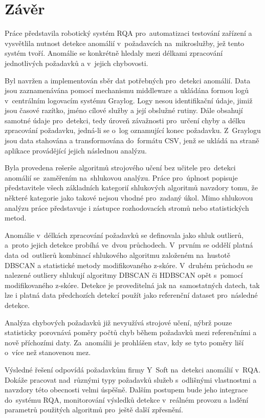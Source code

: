 \chapter*{Závěr}

Práce představila robotický systém RQA pro~automatizaci testování zařízení a vysvětlila nutnost detekce anomálií v~požadavcích na~mikroslužby, jež tento systém tvoří. Anomálie se konkrétně hledaly mezi délkami zpracování jednotlivých požadavků a v~jejich chybovosti.

Byl navržen a implementován sběr dat potřebných pro~detekci anomálií. Data jsou zaznamenávána pomocí mechanismu middleware a ukládána formou logů v~centrálním logovacím systému Graylog. Logy nesou identifikační údaje, jimiž jsou časové razítko, jméno cílové služby a její obslužné rutiny. Dále obsahují samotné údaje pro~detekci, tedy úroveň závažnosti pro~určení chyby a délku zpracování požadavku, jedná-li se o~log oznamující konec požadavku. Z~Graylogu jsou data stahována a transformována do~formátu CSV, jenž se ukládá na straně aplikace provádějící jejich následnou analýzu.

Byla provedena rešerše algoritmů strojového učení bez učitele pro~detekci anomálií se~zaměřením na~shlukovou analýzu. Práce pro~úplnost popisuje představitele všech základních kategorií shlukových algoritmů navzdory tomu, že některé kategorie jako takové nejsou vhodné pro~zadaný úkol. Mimo shlukovou analýzu práce představuje i zástupce rozhodovacích stromů nebo statistických metod.

Anomálie v~délkách zpracování požadavků se definovala jako shluk outlierů, a~proto jejich detekce probíhá ve~dvou průchodech. V~prvním se oddělí platná data od~outlierů kombinací shlukového algoritmu založeném na~hustotě DBSCAN a statistické metody modifikovaného z-skóre. V~druhém průchodu se nalezené outliery shlukují algoritmy DBSCAN či HDBSCAN opět s~pomocí modifikovaného z-skóre. Detekce je proveditelná jak na~samostatných datech, tak lze i platná data předchozích detekcí použít jako referenční dataset pro~následné detekce.

Analýza chybových požadavků již nevyužívá strojové učení, nýbrž pouze statisticky porovnává poměry počtů chyb během požadavků mezi referenčními a nově příchozími daty. Za~anomálii je prohlášen stav, kdy se tyto poměry liší o~více než stanovenou mez.

Výsledné řešení odpovídá požadavkům firmy Y~Soft na~detekci anomálií v~RQA. Dokáže pracovat nad~různými typy požadavků služeb s~odlišnými vlastnostmi a navzdory této obecnosti velmi úspěšně. Dalším postupem bude jeho integrace do~systému RQA, monitorování výsledků detekce v~reálném provozu a ladění parametrů použitých algoritmů pro~ještě další zpřesnění.